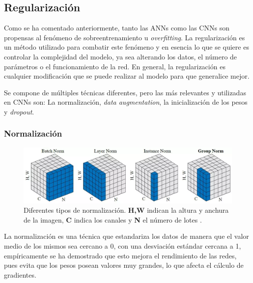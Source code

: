\subsection{Regularización}
\label{subsection:regularization}
Como se ha comentado anteriormente, tanto las ANNs como las CNNs son propensas al fenómeno de sobreentrenamiento u \textit{overfitting}. La regularización es un método utilizado para combatir este fenómeno y en esencia lo que se quiere es controlar la complejidad del modelo, ya sea alterando los datos, el número de parámetros o el funcionamiento de la red. En general, la regularización es cualquier modificación que se puede realizar al modelo para que generalice mejor.

Se compone de múltiples técnicas diferentes, pero las más relevantes y utilizadas en CNNs son: La normalización, \textit{data augmentation}, la inicialización de los pesos y \textit{dropout}.

\subsubsection{Normalización}

\begin{figure}[h]
    \centering
    \includegraphics[width=\linewidth]{figures/2_theory/normTypes.png}
    \caption[Tipos de normalización]{Diferentes tipos de normalización. \textbf{H,W} indican la altura y anchura de la imagen, \textbf{C} indica los canales y \textbf{N} el número de lotes \cite{wu2018group}.}
    \label{fig:normTypes}
\end{figure}

La normalización es una técnica que estandariza los datos de manera que el valor medio de los mismos sea cercano a 0, con una desviación estándar cercana a 1, empíricamente se ha demostrado que esto mejora el rendimiento de las redes, pues evita que los pesos posean valores muy grandes, lo que afecta el cálculo de gradientes. 

